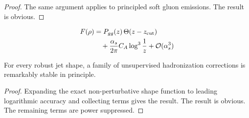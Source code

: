 \begin{proof}
The same argument applies to principled soft gluon emissions. The result
is obvious.
\end{proof}

\begin{align}
  F(\rho) &= P_{gg}(z) \, \Theta(z - z_{\rm cut}) \nonumber \\
  &\quad + \frac{\alpha_s}{2\pi} C_A \log^{3} \frac{1}{z} + \mathcal{O}(\alpha_s^3) \label{eq:3}
\end{align}

\begin{corollary}\label{thm:4}
For every robust jet shape, a family of unsupervised hadronization
corrections is remarkably stable in principle.
\end{corollary}

\begin{proof}
Expanding the exact non-perturbative shape function to leading
logarithmic accuracy and collecting terms gives the result. The result
is obvious. The remaining terms are power suppressed.
\end{proof}

